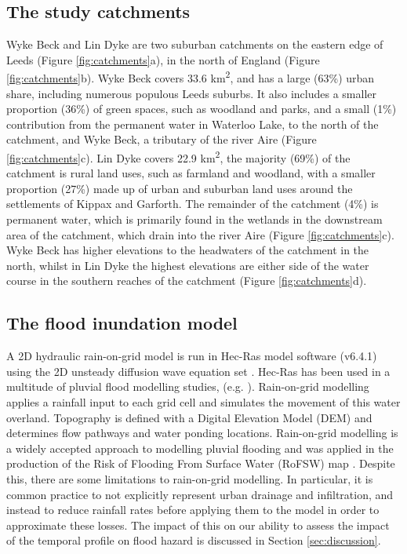 \documentclass[APA,Times2COL]{WileyNJDv5}
\begin{document}
\subsection{The study catchments}\label{subsec:model:catchments}
Wyke Beck and Lin Dyke are two suburban catchments on the eastern edge of Leeds (Figure \ref{fig:catchments}a), in the north of England (Figure \ref{fig:catchments}b). Wyke Beck covers 33.6 km\textsuperscript{2}, and has a large (63\%) urban share, including numerous populous Leeds suburbs. It also includes a smaller proportion (36\%) of green spaces, such as woodland and parks, and a small (1\%) contribution from the permanent water in Waterloo Lake, to the north of the catchment, and Wyke Beck, a tributary of the river Aire (Figure \ref{fig:catchments}c). Lin Dyke covers 22.9 km\textsuperscript{2}, the majority (69\%) of the catchment is rural land uses, such as farmland and woodland, with a smaller proportion (27\%) made up of urban and suburban land uses around the settlements of Kippax and Garforth. The remainder of the catchment (4\%) is permanent water, which is primarily found in the wetlands in the downstream area of the catchment, which drain into the river Aire (Figure \ref{fig:catchments}c). Wyke Beck has higher elevations to the headwaters of the catchment in the north, whilst in Lin Dyke the highest elevations are either side of the water course in the southern reaches of the catchment (Figure \ref{fig:catchments}d). 

\subsection{The flood inundation model}\label{subsec:model:catchments}

A 2D hydraulic rain-on-grid model is run in Hec-Ras model software (v6.4.1) using the 2D unsteady diffusion wave equation set \citep{brunner2016hec}. Hec-Ras has been used in a multitude of pluvial flood modelling studies, (e.g. \citet{costabile2021hec, yalcin2020assessing, singh2023drainage, rangari2019assessment}). Rain-on-grid modelling applies a rainfall input to each grid cell and simulates the movement of this water overland. Topography is defined with a Digital Elevation Model (DEM) and determines flow pathways and water ponding locations. Rain-on-grid modelling is a widely accepted approach to modelling pluvial flooding and was applied in the production of the Risk of Flooding From Surface Water (RoFSW) map \citep{envagency2019}. Despite this, there are some limitations to rain-on-grid modelling. In particular, it is common practice to not explicitly represent urban drainage and infiltration, and instead to reduce rainfall rates before applying them to the model in order to approximate these losses. The impact of this on our ability to assess the impact of the temporal profile on flood hazard is discussed in Section \ref{sec:discussion}.
\end{document}
